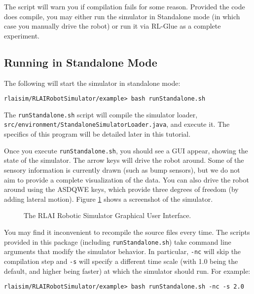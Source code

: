 \documentclass[12pt]{article}
\newcommand{\code}[1]{\texttt{#1}}
\begin{document}
The script will warn you if compilation fails for some reason. Provided the
code does compile, you may either run the simulator in Standalone mode
(in which case you manually drive the robot) or run it via RL-Glue as a 
complete experiment.

\subsection{Running in Standalone Mode}\label{subsec:standalone}

The following will start the simulator in standalone mode:

\begin{verbatim}
rlaisim/RLAIRobotSimulator/example> bash runStandalone.sh 
\end{verbatim}

The \verb+runStandalone.sh+ script will compile the simulator loader,
\verb+src/environment/StandaloneSimulatorLoader.java+, and execute it. The 
specifics of this program will be detailed later in this tutorial.

Once you execute \verb+runStandalone.sh+, you should see a GUI appear, showing
the state of the simulator. The arrow keys will drive the robot around. Some 
of the
sensory information is currently drawn (such as bump sensors), but we do not
aim to provide a complete visualization of the data. You can also drive the
robot around using the ASDQWE keys, which provide three degrees of freedom
(by adding lateral motion). Figure \ref{fig:gui} shows a screenshot of
the simulator.

\begin{figure}\label{fig:gui}
\centerline{
}
\caption{The RLAI Robotic Simulator Graphical User Interface.}
\end{figure}

You may find it inconvenient to recompile the source files every time. The
scripts provided in this package (including \code{runStandalone.sh}) take
command line arguments that modify the simulator behavior. In particular,
\code{-nc} will skip the compilation step and \code{-s} will specify a 
different time scale (with 1.0 being the default, and higher being faster)
at which the simulator should run. For example:

\begin{verbatim}
rlaisim/RLAIRobotSimulator/example> bash runStandalone.sh -nc -s 2.0
\end{verbatim}
\end{document}
